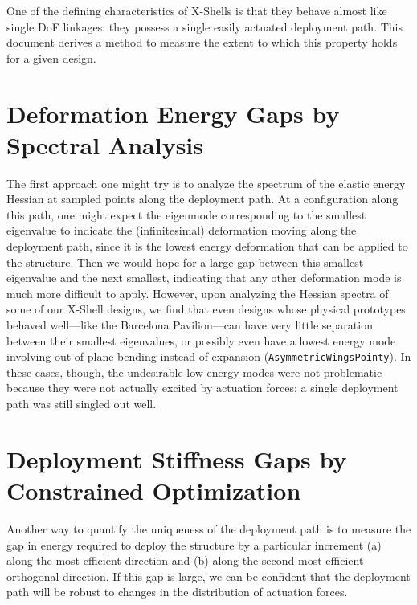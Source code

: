 \documentclass[10pt]{article}
\title{\documenttitle}
\author{Julian Panetta}
\begin{document}
\maketitle

One of the defining characteristics of X-Shells is that they behave almost like
single DoF linkages: they possess a single easily actuated deployment path.
This document derives a method to measure the extent to which this property holds
for a given design.

\section{Deformation Energy Gaps by Spectral Analysis}
The first approach one might try is to analyze the spectrum of the elastic
energy Hessian at sampled points along the deployment path. At a configuration
along this path, one might expect the eigenmode corresponding to the smallest
eigenvalue to indicate the (infinitesimal) deformation moving along the
deployment path, since it is the lowest energy deformation that can be applied
to the structure. Then we would hope for a large gap between this smallest
eigenvalue and the next smallest, indicating that any other deformation mode is
much more difficult to apply. However, upon analyzing the Hessian spectra of
some of our X-Shell designs, we find that even designs whose physical
prototypes behaved well---like the Barcelona Pavilion---can have very
little separation between their smallest eigenvalues, or possibly even have a
lowest energy mode involving out-of-plane bending instead of expansion
(\texttt{AsymmetricWingsPointy}). In these cases, though, the undesirable low
energy modes were not problematic because they were not actually excited by actuation
forces; a single deployment path was still singled out well.

\section{Deployment Stiffness Gaps by Constrained Optimization}
Another way to quantify the uniqueness of the deployment path is to measure
the gap in energy required to deploy the structure by a particular increment
(a) along the most efficient direction and (b) along the second most efficient
orthogonal direction. If this gap is large, we can be confident that the
deployment path will be robust to changes in the distribution of actuation
forces.
\end{document}
